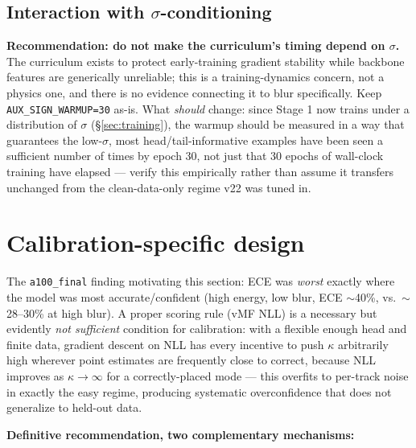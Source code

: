\documentclass[11pt]{article}
\newcommand{\code}[1]{\texttt{#1}}
\begin{document}
\subsection{Interaction with $\sigma$-conditioning}
\textbf{Recommendation: do not make the curriculum's timing depend on $\sigma$.} The
curriculum exists to protect early-training gradient stability while backbone features are
generically unreliable; this is a training-dynamics concern, not a physics one, and there is
no evidence connecting it to blur specifically. Keep \code{AUX\_SIGN\_WARMUP=30} as-is. What
\emph{should} change: since Stage 1 now trains under a distribution of $\sigma$
(\S\ref{sec:training}), the warmup should be measured in a way that guarantees the
low-$\sigma$, most head/tail-informative examples have been seen a sufficient number of times
by epoch 30, not just that 30 epochs of wall-clock training have elapsed --- verify this
empirically rather than assume it transfers unchanged from the clean-data-only regime v22 was
tuned in.

\section{Calibration-specific design}
\label{sec:calibration}

The \code{a100\_final} finding motivating this section: ECE was \emph{worst} exactly where
the model was most accurate/confident (high energy, low blur, ECE $\sim$40\%, vs.\
$\sim$28--30\% at high blur). A proper scoring rule (vMF NLL) is a necessary but evidently
\emph{not sufficient} condition for calibration: with a flexible enough head and finite data,
gradient descent on NLL has every incentive to push $\kappa$ arbitrarily high wherever
point estimates are frequently close to correct, because NLL improves as $\kappa\to\infty$
for a correctly-placed mode --- this overfits to per-track noise in exactly the easy regime,
producing systematic overconfidence that does not generalize to held-out data.

\textbf{Definitive recommendation, two complementary mechanisms:}
\end{document}
